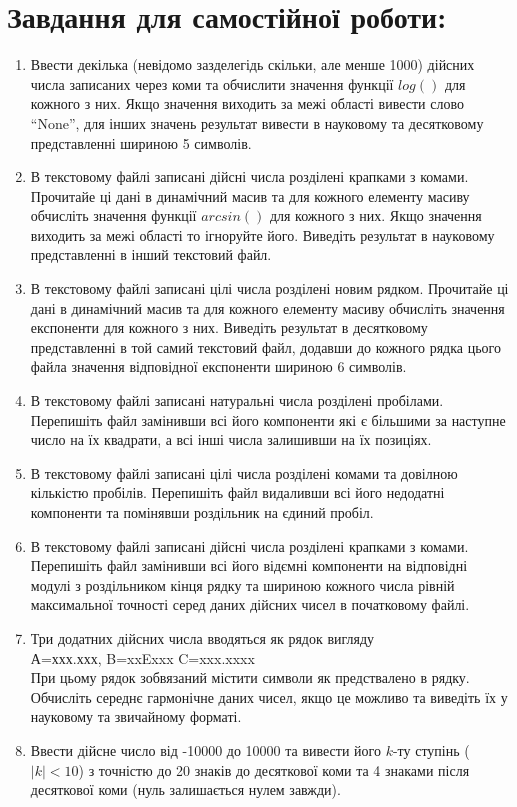 \documentclass[a5paper,titlepage,openany,twoside,draft]{book_unv}%
\begin{document}
\section{Завдання для самостійної роботи:}

\begin{enumerate}
\def\labelenumi{\arabic{enumi})}
\setcounter{enumi}{5}
\item
  Ввести декілька (невідомо зазделегідь скільки, але менше 1000) дійсних числа записаних
  через коми та обчислити значення функції $log()$ для кожного з них. Якщо
  значення виходить за межі області вивести слово ``None'', для інших
  значень результат вивести в науковому та десятковому представленні
  шириною 5 символів.

\item
  В текстовому файлі записані дійсні числа розділені
 крапками з комами. Прочитайе ці дані в динамічний масив та 
 для кожного елементу масиву обчисліть значення функції $arcsin()$ для кожного з них. 
 Якщо значення виходить за межі області то ігноруйте його. 
 Виведіть результат в науковому представленні в інший текстовий файл.

\item
  В текстовому файлі записані цілі числа розділені
новим рядком. Прочитайе ці дані в динамічний масив та 
 для кожного елементу масиву обчисліть значення експоненти для кожного з них. 
 Виведіть результат в десятковому представленні в той самий текстовий файл,
додавши до кожного рядка цього файла значення відповідної експоненти шириною 6 символів.

\item
  В текстовому файлі записані натуральні числа розділені
пробілами. Перепишіть файл замінивши всі його компоненти які є
більшими за наступне число на їх квадрати, а всі інші числа залишивши на їх позиціях.

\item
  В текстовому файлі записані цілі числа розділені комами та довілною кількістю пробілів. 
 Перепишіть файл видаливши всі його недодатні компоненти та помінявши роздільник на єдиний пробіл.

\item
В текстовому файлі записані дійсні числа розділені
 крапками з комами.  Перепишіть файл замінивши всі його відємні компоненти 
на відповідні модулі з роздільником кінця рядку та шириною кожного числа рівній
максимальної точності серед даних дійсних чисел в початковому файлі.
   

\item
  Три додатних дійсних числа вводяться як рядок вигляду \\
  А=ххх.ххх, B=xxExxx C=xxx.xxxx\\
  При цьому рядок зобвязаний містити символи як предствалено в рядку.  
Обчисліть середнє гармонічне даних чисел, якщо це можливо 
та виведіть їх у науковому та звичайному форматі.
\item
  Ввести дійсне число від -10000 до 10000 та вивести його $k$-ту ступінь
  ($|k|<10$) з точністю до 20 знаків до десяткової коми та 4
  знаками після десяткової коми (нуль залишається нулем завжди).


\end{enumerate}
\end{document}
